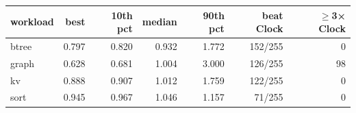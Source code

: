 \begin{tabular}{lrrrrrr}
\toprule
workload & best & 10th pct & median & 90th pct & beat Clock & $\geq$3× Clock \\
\midrule
btree & 0.797 & 0.820 & 0.932 & 1.772 & 152/255 & 0 \\
graph & 0.628 & 0.681 & 1.004 & 3.000 & 126/255 & 98 \\
kv & 0.888 & 0.907 & 1.012 & 1.759 & 122/255 & 0 \\
sort & 0.945 & 0.967 & 1.046 & 1.157 & 71/255 & 0 \\
\bottomrule
\end{tabular}
